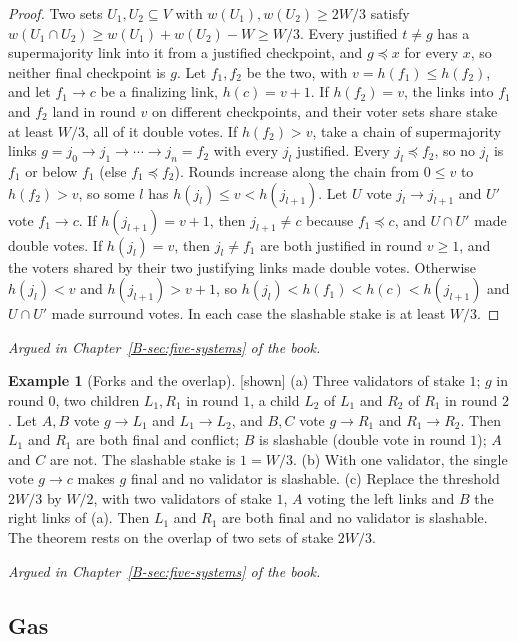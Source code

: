 \documentclass[11pt, a4paper]{article}
\theoremstyle{plain}
\theoremstyle{definition}
\newtheorem{example}[theorem]{Example}
\theoremstyle{remark}
\newcommand{\argued}[1]{\par\noindent\textit{Argued in Chapter~\ref{B-#1} of the book.}\par}
\newcommand{\kind}[1]{\textup{[#1]}}
\begin{document}
\begin{proof}
Two sets $U_1,U_2\subseteq V$ with $w(U_1),w(U_2)\ge 2W/3$ satisfy $w(U_1\cap U_2)\ge w(U_1)+w(U_2)-W\ge W/3$.
Every justified $t\ne g$ has a supermajority link into it from a justified checkpoint, and $g\preceq x$ for
every $x$, so neither final checkpoint is $g$. Let $f_1,f_2$ be the two, with $v=h(f_1)\le h(f_2)$, and let
$f_1\to c$ be a finalizing link, $h(c)=v+1$.
If $h(f_2)=v$, the links into $f_1$ and $f_2$ land in round $v$ on different checkpoints, and their voter sets
share stake at least $W/3$, all of it double votes.
If $h(f_2)>v$, take a chain of supermajority links $g=j_0\to j_1\to\cdots\to j_n=f_2$ with every $j_l$
justified. Every $j_l\preceq f_2$, so no $j_l$ is $f_1$ or below $f_1$ (else $f_1\preceq f_2$). Rounds increase
along the chain from $0\le v$ to $h(f_2)>v$, so some $l$ has $h(j_l)\le v<h(j_{l+1})$. Let $U$ vote
$j_l\to j_{l+1}$ and $U'$ vote $f_1\to c$. If $h(j_{l+1})=v+1$, then $j_{l+1}\ne c$ because $f_1\preceq c$,
and $U\cap U'$ made double votes. If $h(j_l)=v$, then $j_l\ne f_1$ are both justified in round $v\ge1$, and the
voters shared by their two justifying links made double votes. Otherwise $h(j_l)<v$ and $h(j_{l+1})>v+1$, so
$h(j_l)<h(f_1)<h(c)<h(j_{l+1})$ and $U\cap U'$ made surround votes. In each case the slashable stake is at
least $W/3$.
\end{proof}

\argued{sec:five-systems}

\begin{example}[Forks and the overlap]\label{spec:casper-examples} \kind{shown}
(a) Three validators of stake $1$; $g$ in round $0$, two children $L_1,R_1$ in round $1$, a child $L_2$ of $L_1$
and $R_2$ of $R_1$ in round $2$. Let $A,B$ vote $g\to L_1$ and $L_1\to L_2$, and $B,C$ vote $g\to R_1$ and
$R_1\to R_2$. Then $L_1$ and $R_1$ are both final and conflict; $B$ is slashable (double vote in round $1$); $A$
and $C$ are not. The slashable stake is $1=W/3$.
(b) With one validator, the single vote $g\to c$ makes $g$ final and no validator is slashable.
(c) Replace the threshold $2W/3$ by $W/2$, with two validators of stake $1$, $A$ voting the left links and $B$ the
right links of (a). Then $L_1$ and $R_1$ are both final and no validator is slashable. The theorem rests on
the overlap of two sets of stake $2W/3$.
\end{example}

\argued{sec:five-systems}

\subsection*{Gas}
\end{document}
